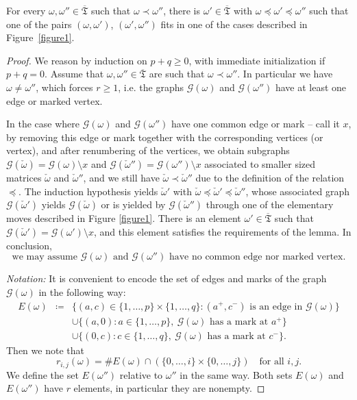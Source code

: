 \documentclass[ALCO,Unicode]{cedram}
\newcommand{\card}[1]{\# #1}
\newcommand{\ppermutationsof}{\mathfrak{T}}
\newcommand{\parameters}{\overline{\ppermutationsof}}
\begin{document}
\begin{lemma}
\label{L3.6}
For every $\omega,\omega''\in\parameters$ such that $\omega\prec\omega''$, there is $\omega'\in\parameters$ with $\omega\preceq\omega'\preceq\omega''$ such that one of the pairs $(\omega,\omega')$, $(\omega',\omega'')$ fits in one of the cases described in Figure~\ref{figure1}.
\end{lemma}

\begin{proof}
We reason by induction on $p+q\geq 0$, with immediate initialization if $p+q=0$.
Assume that $\omega,\omega''\in\parameters$ are such that $\omega\prec\omega''$. In particular we have $\omega\not=\omega''$,
which forces $r\geq 1$,
i.e.  the graphs $\mathcal{G}(\omega)$ and $\mathcal{G}(\omega'')$ have at least one edge or marked vertex.

In the case where $\mathcal{G}(\omega)$ and $\mathcal{G}(\omega'')$ have
one common edge or mark -- call it $x$,
by removing this edge or mark together with the corresponding vertices (or vertex), and after renumbering of the vertices, we obtain subgraphs $\mathcal{G}(\check\omega)=\mathcal{G}(\omega)\setminus x$ and $\mathcal{G}(\check\omega'')=\mathcal{G}(\omega'')\setminus x$ associated to smaller sized matrices $\check\omega$ and $\check\omega''$, and we still have $\check\omega\prec\check\omega''$ due to the definition of the relation $\preceq$. The induction hypothesis yields $\check\omega'$ with $\check\omega\preceq\check\omega'\preceq\check\omega''$, whose associated graph $\mathcal{G}(\check\omega')$ yields $\mathcal{G}(\check\omega)$ or is yielded by $\mathcal{G}(\check\omega'')$ through one of the elementary moves described in Figure \ref{figure1}. There is an element $\omega'\in\parameters$ such that $\mathcal{G}(\check\omega')=\mathcal{G}(\omega')\setminus x$, and this element satisfies the requirements of the lemma. In conclusion,
\begin{equation}
\label{no-common-edge}
\mbox{we may assume $\mathcal{G}(\omega)$ and $\mathcal{G}(\omega'')$ have no common edge nor marked vertex.}
\end{equation}

\noindent
{\it Notation:}
It is convenient to encode the set of edges and marks of the graph $\mathcal{G}(\omega)$ in the following way:
\begin{eqnarray*}
E(\omega) & \coloneqq  & \{(a,c)\in\{1,\ldots,p\}\times\{1,\ldots,q\}:\mbox{$(a^+,c^-)$ is an edge in $\mathcal{G}(\omega)$}\}\\
 & & \cup\{(a,0):a\in\{1,\ldots,p\},\ \mbox{$\mathcal{G}(\omega)$ has a mark at $a^+$}\}\\
 & & \cup\{(0,c):c\in\{1,\ldots,q\},\ \mbox{$\mathcal{G}(\omega)$ has a mark at $c^-$}\}.
\end{eqnarray*}
Then we note that
\begin{equation}
\label{E-and-rij}
r_{i,j}(\omega)=\card E(\omega)\cap(\{0,\ldots,i\}\times\{0,\ldots,j\})\quad\mbox{for all $i,j$}.
\end{equation}
We define the set $E(\omega'')$ relative to $\omega''$ in the same way.
Both sets $E(\omega)$ and $E(\omega'')$ have $r$ elements, in particular they are nonempty.



\end{proof}
\end{document}
